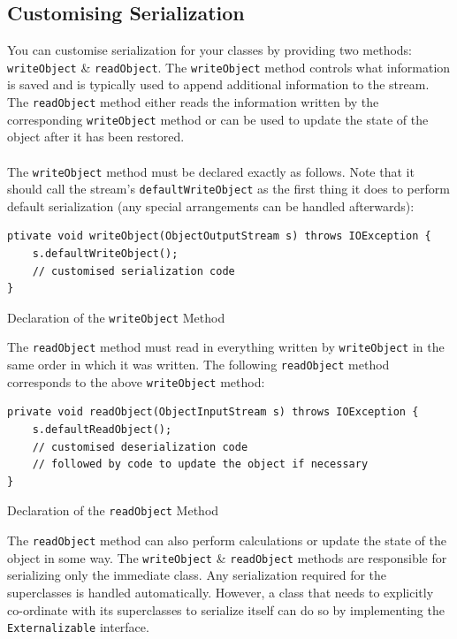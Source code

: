 \documentclass[a4paper,11pt]{article}
\newenvironment{code}{\captionsetup{type=listing}}{}
\begin{document}
\subsection{Customising Serialization}
You can customise serialization for your classes by providing two methods: \verb|writeObject| \&
\verb|readObject|.
The \verb|writeObject| method controls what information is saved and is typically used to append additional 
information to the stream.
The \verb|readObject| method either reads the information written by the corresponding \verb|writeObject|
method or can be used to update the state of the object after it has been restored.
\\\\
The \verb|writeObject| method must be declared exactly as follows.
Note that it should call the stream's \verb|defaultWriteObject| as the first thing it does to perform
default serialization (any special arrangements can be handled afterwards):
\begin{code}
\begin{verbatim}
ptivate void writeObject(ObjectOutputStream s) throws IOException {
    s.defaultWriteObject();
    // customised serialization code
}
\end{verbatim}
\caption{Declaration of the \texttt{writeObject} Method}
\end{code}

The \verb|readObject| method must read in everything written by \verb|writeObject| in the same order in which
it was written.
The following \verb|readObject| method corresponds to the above \verb|writeObject| method:
\begin{code}
\begin{verbatim}
private void readObject(ObjectInputStream s) throws IOException {
    s.defaultReadObject();
    // customised deserialization code
    // followed by code to update the object if necessary
}
\end{verbatim}
\caption{Declaration of the \texttt{readObject} Method}
\end{code}

The \verb|readObject| method can also perform calculations or update the state of the object in some way.
The \verb|writeObject| \& \verb|readObject| methods are responsible for serializing only the immediate class.
Any serialization required for the superclasses is handled automatically.
However, a class that needs to explicitly co-ordinate with its superclasses to serialize itself can do so by 
implementing the \verb|Externalizable| interface.
\end{document}
